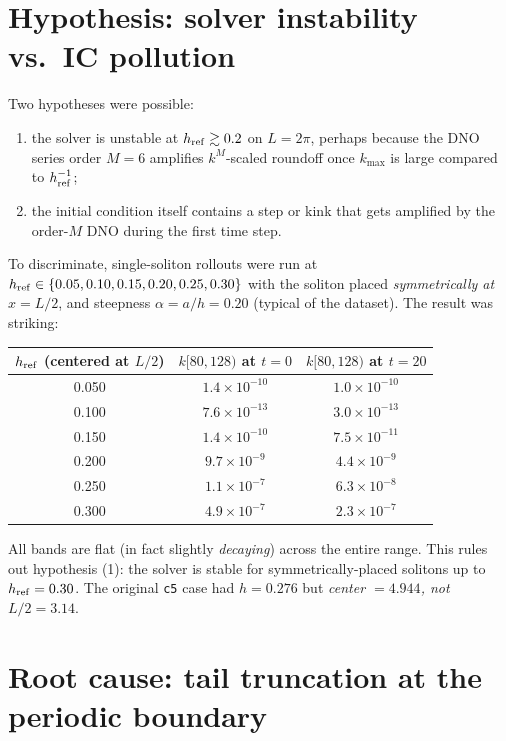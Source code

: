 \documentclass[11pt]{article}
\begin{document}
\section{Hypothesis: solver instability vs.\ IC pollution}

Two hypotheses were possible:
\begin{enumerate}
  \item the solver is unstable at $h_{\rm ref} \gtrsim 0.2$ on $L = 2\pi$, perhaps
        because the DNO series order $M = 6$ amplifies $k^M$-scaled roundoff
        once $k_{\max}$ is large compared to $h_{\rm ref}^{-1}$;
  \item the initial condition itself contains a step or kink that gets
        amplified by the order-$M$ DNO during the first time step.
\end{enumerate}

To discriminate, single-soliton rollouts were run at $h_{\rm ref} \in
\{0.05, 0.10, 0.15, 0.20, 0.25, 0.30\}$ with the soliton placed
\emph{symmetrically at $x = L/2$}, and steepness $\alpha = a/h = 0.20$
(typical of the dataset). The result was striking:

\begin{center}
\begin{tabular}{ccc}
\toprule
$h_{\rm ref}$ (centered at $L/2$) & $k[80,128)$ at $t{=}0$ & $k[80,128)$ at $t{=}20$ \\
\midrule
0.050 & $1.4\times 10^{-10}$ & $1.0\times 10^{-10}$ \\
0.100 & $7.6\times 10^{-13}$ & $3.0\times 10^{-13}$ \\
0.150 & $1.4\times 10^{-10}$ & $7.5\times 10^{-11}$ \\
0.200 & $9.7\times 10^{-9}$ & $4.4\times 10^{-9}$ \\
0.250 & $1.1\times 10^{-7}$ & $6.3\times 10^{-8}$ \\
0.300 & $4.9\times 10^{-7}$ & $2.3\times 10^{-7}$ \\
\bottomrule
\end{tabular}
\end{center}

All bands are flat (in fact slightly \emph{decaying}) across the entire range.
This rules out hypothesis (1): the solver is stable for symmetrically-placed
solitons up to $h_{\rm ref} = 0.30$. The original \texttt{c5} case had
$h{=}0.276$ but \emph{center $= 4.944$, not $L/2 = 3.14$}.

\section{Root cause: tail truncation at the periodic boundary}
\end{document}
